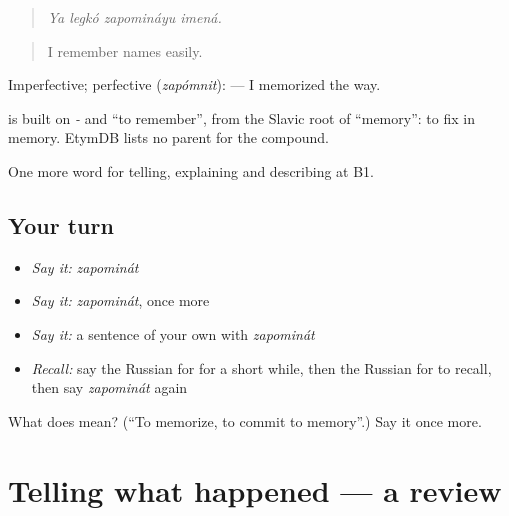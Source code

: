 \begin{quote}
\emph{Ya legkó zapomináyu imená.}
\end{quote}

\begin{quote}
I remember names easily.
\end{quote}

Imperfective; perfective \emph{} (\emph{zapómnit}): \emph{  } — I memorized the way.

\begin{cousinweb}
\emph{} is built on \emph{-} and \emph{} \textquotedblleft{}to remember\textquotedblright{}, from the Slavic root of \emph{} \textquotedblleft{}memory\textquotedblright{}: to fix in memory. EtymDB lists no parent for the compound.
\end{cousinweb}

\begin{grammarlens}[title={What you've built}]
One more word for telling, explaining and describing at B1.
\end{grammarlens}

\subsection*{Your turn}
\begin{itemize}
\raggedright
  \item \emph{Say it:} \emph{zapominát}
  \item \emph{Say it:} \emph{zapominát}, once more
  \item \emph{Say it:} a sentence of your own with \emph{zapominát}
  \item \emph{Recall:} say the Russian for for a short while, then the Russian for to recall, then say \emph{zapominát} again
\end{itemize}

\begin{tcolorbox}[breakable,colback=teal!4,colframe=teal!35!black,title={Before you move on}]
What does  mean? (\textquotedblleft{}To memorize, to commit to memory\textquotedblright{}.) Say it once more.
\end{tcolorbox}
\section[(dialogue)]{Telling what happened — a review}

\label{lesson:RU-R278-review-271-278}



